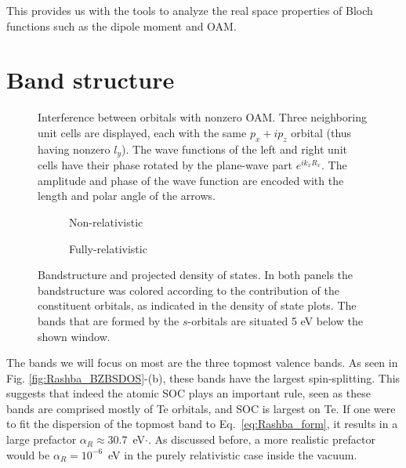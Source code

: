 This provides us with the tools to analyze the real space properties of Bloch functions such as the dipole moment and OAM.



\section{Band structure}
\begin{figure}[b!]
\caption{\label{fig:interference}Interference between orbitals with nonzero OAM. Three neighboring unit cells are displayed, each with the same $p_x + ip_z$ orbital (thus having nonzero $l_y$). The wave functions of the left and right unit cells have their phase rotated by the plane-wave part $e^{i k_x R_x}$. The amplitude and phase of the wave function are encoded with the length and polar angle of the arrows.}
\end{figure}
\begin{figure}[b!]
	\begin{subfigure}[b]{0.49\textwidth}
	\caption{Non-relativistic}
	\end{subfigure}
	\begin{subfigure}[b]{0.49\textwidth}
	\caption{Fully-relativistic}
	\end{subfigure}
\caption{\label{fig:GeTe_bands_dos} Bandstructure and projected density of states. In both panels the bandstructure was colored according to the contribution of the constituent orbitals, as indicated in the density of state plots. The bands that are formed by the $s$-orbitals are situated 5 eV below the shown window.}
\end{figure}
The bands we will focus on most are the three topmost valence bands. As seen in Fig. \ref{fig:Rashba_BZBSDOS}-(b), these bands have the largest spin-splitting. This suggests that indeed the atomic SOC plays an important rule, seen as these bands are comprised mostly of Te orbitals, and SOC is largest on Te. If one were to fit the dispersion of the topmost band to Eq.~\ref{eq:Rashba_form},
it results in a large prefactor $\alpha_R\approx 30.7$~eV$\cdot$\angstrom \cite{DiSante2013}. As discussed before, a more realistic prefactor would be $\alpha_R=10^{-6}$~eV in the purely relativistic case inside the vacuum.


